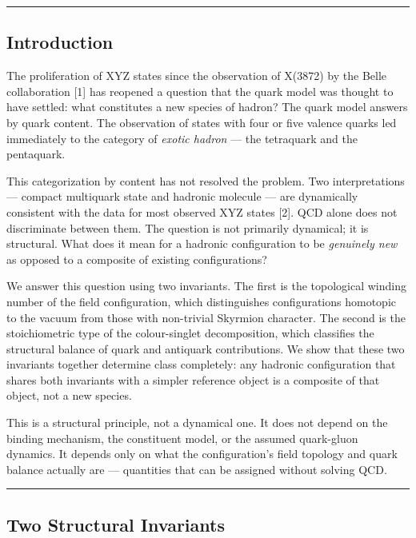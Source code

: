 \begin{center}\rule{0.5\linewidth}{0.5pt}\end{center}

\hypertarget{introduction}{%
\subsection{Introduction}\label{introduction}}

The proliferation of XYZ states since the observation of X(3872) by the
Belle collaboration {[}1{]} has reopened a question that the quark model
was thought to have settled: what constitutes a new species of hadron?
The quark model answers by quark content. The observation of states with
four or five valence quarks led immediately to the category of
\emph{exotic hadron} --- the tetraquark and the pentaquark.

This categorization by content has not resolved the problem. Two
interpretations --- compact multiquark state and hadronic molecule ---
are dynamically consistent with the data for most observed XYZ states
{[}2{]}. QCD alone does not discriminate between them. The question is
not primarily dynamical; it is structural. What does it mean for a
hadronic configuration to be \emph{genuinely new} as opposed to a
composite of existing configurations?

We answer this question using two invariants. The first is the
topological winding number of the field configuration, which
distinguishes configurations homotopic to the vacuum from those with
non-trivial Skyrmion character. The second is the stoichiometric type of
the colour-singlet decomposition, which classifies the structural
balance of quark and antiquark contributions. We show that these two
invariants together determine class completely: any hadronic
configuration that shares both invariants with a simpler reference
object is a composite of that object, not a new species.

This is a structural principle, not a dynamical one. It does not depend
on the binding mechanism, the constituent model, or the assumed
quark-gluon dynamics. It depends only on what the configuration's field
topology and quark balance actually are --- quantities that can be
assigned without solving QCD.

\begin{center}\rule{0.5\linewidth}{0.5pt}\end{center}

\hypertarget{two-structural-invariants}{%
\subsection{Two Structural Invariants}\label{two-structural-invariants}}

